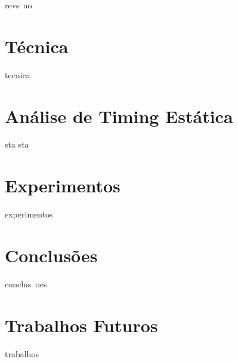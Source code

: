 \documentclass[10pt,a4paper]{beamer}
\begin{document}
		\begin{frame}
		revs~ao
		\end{frame}
	
	\section{Técnica}
	
		\begin{frame}
		tecnica
		\end{frame}
	
	\section{Análise de Timing Estática}
	
		\begin{frame}
		sta sta
		\end{frame}
	
	\section{Experimentos}
	
		\begin{frame}
		experimentos
		\end{frame}
	
	\section{Conclusões}
	
		\begin{frame}
		conclus~oes
		\end{frame}
	
	\section{Trabalhos Futuros}
		
		\begin{frame}
		trabalhos
		\end{frame}
	
\end{document}
